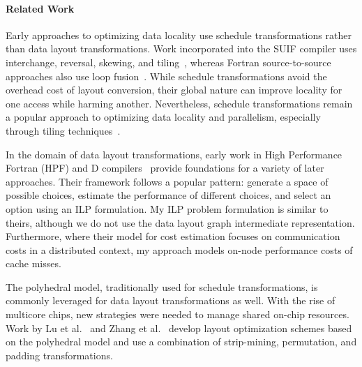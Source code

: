 \documentclass{article}
\begin{document}
\paragraph{Related Work}
Early approaches to optimizing data locality use schedule transformations rather than data layout transformations. 
Work incorporated into the SUIF compiler uses interchange, reversal, skewing, and tiling~\cite{wolf1991data}, whereas Fortran source-to-source approaches also use loop fusion~\cite{mckinley1996improving}.
While schedule transformations avoid the overhead cost of layout conversion, their global nature can improve locality for one access while harming another.
Nevertheless, schedule transformations remain a popular approach to optimizing data locality and parallelism, 
especially through tiling techniques~\cite{bondhugula2008pluto,bertolacci2015parameterized,bondhugula2016diamond,bandishti2012tiling,unat2016tida}.

In the domain of data layout transformations, early work in High Performance Fortran (HPF) and D compilers~\cite{bixby1994automatic,kennedy1995automatic,kennedy1998automatic} provide foundations for a variety of later approaches.
Their framework follows a popular pattern: generate a space of possible choices, estimate the performance of different choices, and select an option using an ILP formulation. 
My ILP problem formulation is similar to theirs, although we do not use the data layout graph intermediate representation.
Furthermore, where their model for cost estimation focuses on communication costs in a distributed context, my approach models on-node performance costs of cache misses.

The polyhedral model, traditionally used for schedule transformations, is commonly leveraged for data layout transformations as well.
With the rise of multicore chips, new strategies were needed to manage shared on-chip resources. 
Work by Lu et al.~\cite{lu2009data} and Zhang et al.~\cite{zhang2011optimizing} develop layout optimization schemes based on the polyhedral model and use a combination of strip-mining, permutation, and padding transformations.
\end{document}
